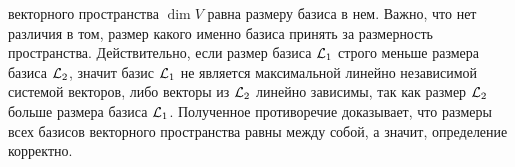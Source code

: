      векторного пространства $\dim V$ равна размеру базиса в нем. Важно, что нет различия в том, размер какого именно базиса принять за размерность пространства. Действительно, если размер базиса $\mathcal{L}_1$ строго меньше размера базиса $\mathcal{L}_2$, значит базис $\mathcal{L}_1$ не является максимальной линейно независимой системой векторов, либо векторы из $\mathcal{L}_2$ линейно зависимы, так как размер $\mathcal{L}_2$ больше размера базиса $\mathcal{L}_1$. Полученное противоречие доказывает, что размеры всех базисов векторного пространства равны между собой, а значит, определение корректно.
